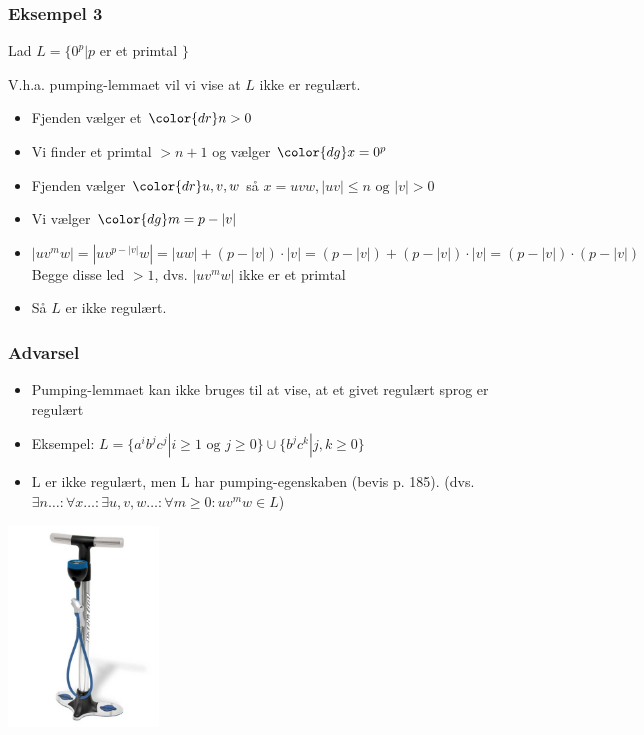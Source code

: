 \begin{frame}
\frametitle{Eksempel 3}
Lad $L = \{0^p | p $ er et primtal $ \}$

V.h.a. pumping-lemmaet vil vi vise at $L$ ikke er regulært.

\begin{itemize}[<+->]
\item Fjenden vælger et ${\color{dr}n}> 0$
\item Vi finder et primtal $>n+1$ og vælger ${\color{dg}x=0^p}$
\item Fjenden vælger ${\color{dr}u,v,w}$ så $x=uvw, |uv|\leq n \text{ og } |v| > 0$
\item Vi vælger ${\color{dg}m=p-|v|}$
\item $|uv^mw| = |uv^{p-|v|}w|=|uw|+(p-|v|)\cdot |v| = (p-|v|) + (p-|v|)\cdot |v|
  =(p-|v|)\cdot(p-|v|)$ Begge disse led $>1$, dvs. $|uv^mw|$ ikke er et primtal
\item Så $L$ er \alert{ikke} regulært.
\end{itemize}
\end{frame}

\begin{frame}
\frametitle{Advarsel}
\begin{itemize}[<+->]
\item  Pumping-lemmaet kan \alert{ikke} bruges til at vise, at  
et givet regulært sprog er regulært 
\item Eksempel: 
 $L = \{ a^ib^jc^j | i\geq 1\text{ og }j\geq 0 \} \cup \{ b^jc^k | j,k\geq 0 \}$
\item L er ikke regulært, men L har pumping-egenskaben (bevis p. 185).
(dvs. $\exists n\ldots:  \forall x\ldots:  \exists u,v,w\ldots:  \forall m\geq 0: uv^mw \in L$)
\end{itemize}
\begin{center}
  \includegraphics[width=4cm]{images/pump.jpg}
\end{center}
\end{frame}

